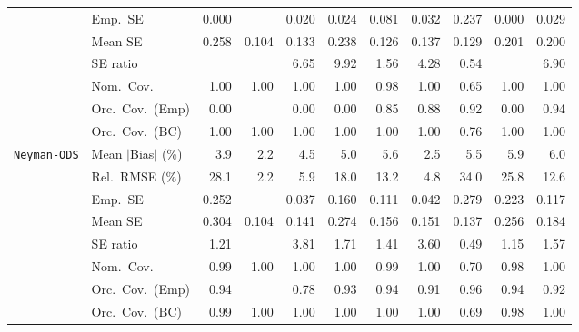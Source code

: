 \begin{landscape}
\begin{longtable}{llrrrrrrrrr}
 & Emp.\ SE & 0.000 &  & 0.020 & 0.024 & 0.081 & 0.032 & 0.237 & 0.000 & 0.029 \\
 & Mean SE & 0.258 & 0.104 & 0.133 & 0.238 & 0.126 & 0.137 & 0.129 & 0.201 & 0.200 \\
 & SE ratio &  &  & 6.65 & 9.92 & \cellcolor{ranktwo}1.56 & \cellcolor{rankthree}4.28 & \cellcolor{rankone}0.54 &  & 6.90 \\
 & Nom.\ Cov. & \cellcolor{ranktwo}1.00 & \cellcolor{ranktwo}1.00 & \cellcolor{ranktwo}1.00 & \cellcolor{ranktwo}1.00 & \cellcolor{rankone}0.98 & \cellcolor{ranktwo}1.00 & \cellcolor{rankthree}0.65 & \cellcolor{ranktwo}1.00 & \cellcolor{ranktwo}1.00 \\
 & Orc.\ Cov.\ (Emp) & 0.00 &  & 0.00 & 0.00 & 0.85 & \cellcolor{rankthree}0.88 & \cellcolor{ranktwo}0.92 & 0.00 & \cellcolor{rankone}0.94 \\
 & Orc.\ Cov.\ (BC) & \cellcolor{rankone}1.00 & \cellcolor{rankone}1.00 & \cellcolor{rankone}1.00 & \cellcolor{rankone}1.00 & \cellcolor{rankone}1.00 & \cellcolor{rankone}1.00 & \cellcolor{ranktwo}0.76 & \cellcolor{rankone}1.00 & \cellcolor{rankone}1.00 \\
\addlinespace[2pt]
\quad \texttt{Neyman-ODS} & Mean $|$Bias$|$ (\%) & \cellcolor{rankthree}3.9 & \cellcolor{rankone}2.2 & 4.5 & 5.0 & 5.6 & \cellcolor{ranktwo}2.5 & 5.5 & 5.9 & 6.0 \\
 & Rel.\ RMSE (\%) & 28.1 & \cellcolor{rankone}2.2 & \cellcolor{rankthree}5.9 & 18.0 & 13.2 & \cellcolor{ranktwo}4.8 & 34.0 & 25.8 & 12.6 \\
 & Emp.\ SE & 0.252 &  & 0.037 & 0.160 & 0.111 & 0.042 & 0.279 & 0.223 & 0.117 \\
 & Mean SE & 0.304 & 0.104 & 0.141 & 0.274 & 0.156 & 0.151 & 0.137 & 0.256 & 0.184 \\
 & SE ratio & \cellcolor{ranktwo}1.21 &  & 3.81 & 1.71 & \cellcolor{rankthree}1.41 & 3.60 & 0.49 & \cellcolor{rankone}1.15 & 1.57 \\
 & Nom.\ Cov. & \cellcolor{ranktwo}0.99 & \cellcolor{rankthree}1.00 & \cellcolor{rankthree}1.00 & \cellcolor{rankthree}1.00 & \cellcolor{ranktwo}0.99 & \cellcolor{rankthree}1.00 & 0.70 & \cellcolor{rankone}0.98 & \cellcolor{rankthree}1.00 \\
 & Orc.\ Cov.\ (Emp) & \cellcolor{rankone}0.94 &  & 0.78 & \cellcolor{ranktwo}0.93 & \cellcolor{rankone}0.94 & 0.91 & \cellcolor{rankone}0.96 & \cellcolor{rankone}0.94 & \cellcolor{rankthree}0.92 \\
 & Orc.\ Cov.\ (BC) & \cellcolor{ranktwo}0.99 & \cellcolor{rankthree}1.00 & \cellcolor{rankthree}1.00 & \cellcolor{rankthree}1.00 & \cellcolor{rankthree}1.00 & \cellcolor{rankthree}1.00 & 0.69 & \cellcolor{rankone}0.98 & \cellcolor{rankthree}1.00 \\

\end{longtable}
\end{landscape}
